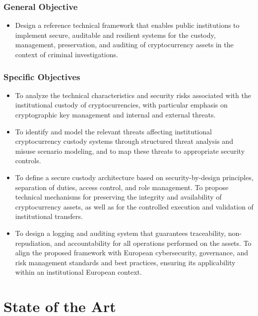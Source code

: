 \documentclass[12pt,a4paper]{report}
\begin{document}
\subsection{General Objective}
\begin{itemize}
\item Design a reference technical framework that enables public institutions to implement secure,  auditable and resilient systems for the custody, management, preservation, and auditing of cryptocurrency assets in the context of criminal investigations.
\end{itemize}

\subsection{Specific Objectives}
\begin{itemize}
 \item To analyze the technical characteristics and security risks associated with the institutional custody of cryptocurrencies, with particular emphasis on cryptographic key management and internal and external threats.
 \item To identify and model the relevant threats affecting institutional cryptocurrency custody systems through structured threat analysis and misuse scenario modeling, and to map these threats to appropriate security controls.
\item To define a secure custody architecture based on security-by-design principles, separation of duties, access control, and role management.
To propose technical mechanisms for preserving the integrity and availability of cryptocurrency assets, as well as for the controlled execution and validation of institutional transfers.
\item To design a logging and auditing system that guarantees traceability, non-repudiation, and accountability for all operations performed on the assets.
To align the proposed framework with European cybersecurity, governance, and risk management standards and best practices, ensuring its applicability within an institutional European context.
\end{itemize}



\chapter{State of the Art}
\end{document}
